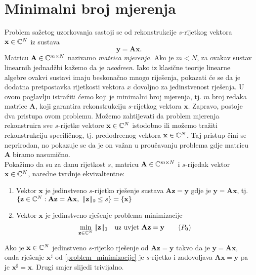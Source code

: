 \documentclass[a4paper,twoside,12pt]{memoir} %
\newcommand{\vect}[1]{\mathbf{#1}}
\renewcommand{\vec}{\vect}
\newcommand{\norm}[1]{\|{#1}\|}
\begin{document}
\section[Minimalni broj mjerenja][Minimalni broj mjerenja]{Minimalni broj mjerenja}
Problem sa\v{z}etog uzorkovanja sastoji se od rekonstrukcije $s$-rijetkog vektora $\vec{x} \in \C^N$ iz sustava
\[\vec{y} = \vec{A}\vec{x}.\]
Matricu $\vec{A} \in \C^{m\times N}$ nazivamo \textit{matrica mjerenja}. Ako je $m < N$, za ovakav sustav linearnih jednad\v{z}bi ka\v{z}emo da je \textit{neodre\dj en}. Iako iz klasi\v{c}ne teorije linearne algebre ovakvi sustavi imaju beskona\v{c}no mnogo rije\v{s}enja, pokazati \'ce se da je dodatna pretpostavka rijetkosti vektora $x$ dovoljno za jedinstvenost rje\v{s}enja. U ovom poglavlju istra\v{z}iti \'cemo koji je minimalni broj mjerenja, tj. $m$ broj redaka matrice $\vec{A}$, koji garantira rekonstrukciju $s$-rijetkog vektora $\vec{x}$. Zapravo, postoje dva pristupa ovom problemu. Mo\v{z}emo zahtijevati da problem mjerenja rekonstruira sve $s$-rijetke vektore $\vec{x} \in \C^N$ istodobno ili mo\v{z}emo tra\v{z}iti rekonstrukciju specifi\v{c}nog, tj. predodre\dj enog vektora $\vec{x} \in \C^N$. Taj pristup \v{c}ini se neprirodan, no pokazuje se da je on va\v{z}an u prou\v{c}avanju problema gdje matricu $\vec{A}$ biramo nasumi\v{c}no. \\ 
\indent Poka\v{z}imo da su za danu rijetkost $s$, matricu $\vec{A} \in \C^{m \times N}$ i $s$-rijedak vektor $\vec{x} \in \C^N$, naredne tvrdnje ekvivaltentne: 
\begin{enumerate}
    \item Vektor $\vec{x}$ je jedinstveno $s$-rijetko rje\v{s}enje sustava $\vec{A}\vec{z}=\vec{y}$ gdje je $\vec{y} = \vec{Ax}$, tj. $\{\vec{z} \in \C^N : \vec{A}\vec{z}= \vec{A}\vec{x},\ \norm{\vec{z}}_0 \leq s\} = \{\vec{x}\}$
    \item Vektor $\vec{x}$ je jedinstveno rje\v{s}enje problema minimizacije
        \begin{equation}\label{problem_minimizacije}
            \min\limits_{\vec{z} \in \C^N} \norm{\vec{z}}_0\quad \text{uz uvjet}\ \vec{Az} = \vec y \tag{$P_{0}$}
        \end{equation}
\end{enumerate}
Ako je $\vec{x} \in \C^N$ jedinstveno $s$-rijetko rje\v{s}enje od $\vec{Az} = \vec y$ takvo da je $\vec y = \vec{Ax}$, onda rje\v{s}enje $\vec x^{\sharp}$ od \eqref{problem_minimizacije} je $s$-rijetko i zadovoljava $\vec{Ax} = \vec y$ pa je $\vec x^\sharp = \vec x$. Drugi smjer slijedi trivijalno.
\end{document}
